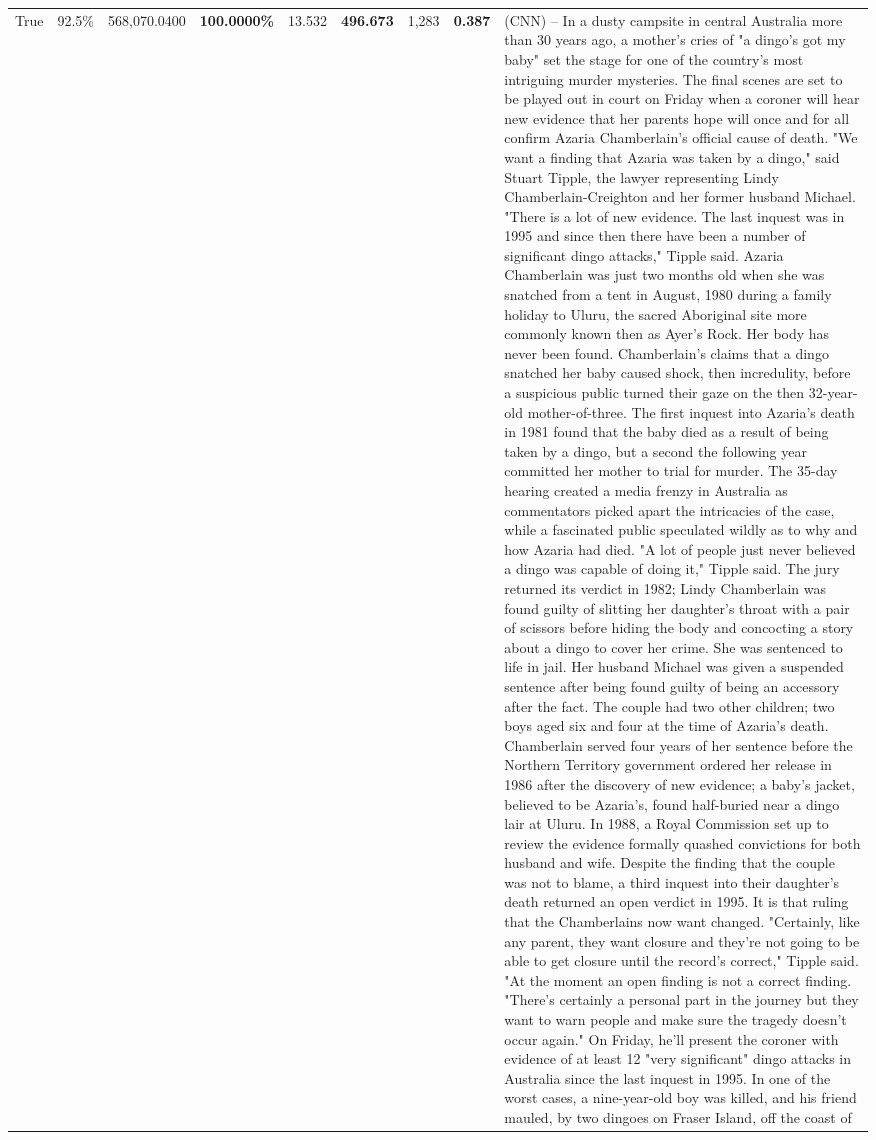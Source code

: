 \begin{table}[H]
\begin{tabular}{lllrlllll}
True & 92.5\% & 568,070.0400 & \bfseries \color{red} 100.0000\% & 13.532 & \bfseries \color{red} 496.673 & 1,283 & \bfseries \color{red} 0.387 & (CNN) -- In a dusty campsite in central Australia more than 30 years ago, a mother's cries of "a dingo's got my baby" set the stage for one of the country's most intriguing murder mysteries. The final scenes are set to be played out in court on Friday when a coroner will hear new evidence that her parents hope will once and for all confirm Azaria Chamberlain's official cause of death. "We want a finding that Azaria was taken by a dingo," said Stuart Tipple, the lawyer representing Lindy Chamberlain-Creighton and her former husband Michael. "There is a lot of new evidence. The last inquest was in 1995 and since then there have been a number of significant dingo attacks," Tipple said. Azaria Chamberlain was just two months old when she was snatched from a tent in August, 1980 during a family holiday to Uluru, the sacred Aboriginal site more commonly known then as Ayer's Rock. Her body has never been found. Chamberlain's claims that a dingo snatched her baby caused shock, then incredulity, before a suspicious public turned their gaze on the then 32-year-old mother-of-three. The first inquest into Azaria's death in 1981 found that the baby died as a result of being taken by a dingo, but a second the following year committed her mother to trial for murder. The 35-day hearing created a media frenzy in Australia as commentators picked apart the intricacies of the case, while a fascinated public speculated wildly as to why and how Azaria had died. "A lot of people just never believed a dingo was capable of doing it," Tipple said. The jury returned its verdict in 1982; Lindy Chamberlain was found guilty of slitting her daughter's throat with a pair of scissors before hiding the body and concocting a story about a dingo to cover her crime. She was sentenced to life in jail. Her husband Michael was given a suspended sentence after being found guilty of being an accessory after the fact. The couple had two other children; two boys aged six and four at the time of Azaria's death. Chamberlain served four years of her sentence before the Northern Territory government ordered her release in 1986 after the discovery of new evidence; a baby's jacket, believed to be Azaria's, found half-buried near a dingo lair at Uluru. In 1988, a Royal Commission set up to review the evidence formally quashed convictions for both husband and wife. Despite the finding that the couple was not to blame, a third inquest into their daughter's death returned an open verdict in 1995. It is that ruling that the Chamberlains now want changed. "Certainly, like any parent, they want closure and they're not going to be able to get closure until the record's correct," Tipple said. "At the moment an open finding is not a correct finding. "There's certainly a personal part in the journey but they want to warn people and make sure the tragedy doesn't occur again." On Friday, he'll present the coroner with evidence of at least 12 "very significant" dingo attacks in Australia since the last inquest in 1995. In one of the worst cases, a nine-year-old boy was killed, and his friend mauled, by two dingoes on Fraser Island, off the coast of 
\end{tabular}
\end{table}
